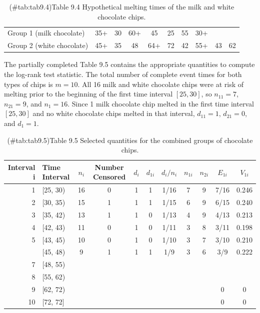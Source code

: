 \documentclass[
]{report}
\begin{document}
\begin{table}[!h]
\centering
\caption{(\#tab:tab9.4)Table 9.4 Hypothetical melting times of the milk and white chocolate chips.}
\centering
\begin{tabular}[t]{llcccccccc}
\toprule
  &  &  &  &  &  &  &  &  & \\
\midrule
Group 1 (milk chocolate) & 35+ & 30 & 60+ & 45 & 25 & 55 & 30+ &  & \\
Group 2 (white chocolate) & 45+ & 35 & 48 & 64+ & 72 & 42 & 55+ & 43 & 62\\
\bottomrule
\end{tabular}
\end{table}

The partially completed Table 9.5 contains the appropriate quantities to compute the log-rank test statistic. The total number of complete event times for both types of chips is \(m = 10\). All 16 milk and white chocolate chips were at risk of melting prior to the beginning of the first time interval \([25,30]\), so \(n_{11} = 7\), \(n_{21} = 9\), and \(n_1 = 16\). Since 1 milk chocolate chip melted in the first time interval \([25,30]\) and no white chocolate chips melted in that interval, \(d_{11} = 1\), \(d_{21} = 0\), and \(d_1 = 1\).

\begin{table}[!h]
\centering
\caption{(\#tab:tab9.5)Table 9.5 Selected quantities for the combined groups of chocolate chips.}
\centering
\begin{tabular}[t]{rlccccccccc}
\toprule
Interval i & Time Interval & $n_i$ & Number Censored & $d_i$ & $d_{1i}$ & $d_i/n_i$ & $n_{1i}$ & $n_{2i}$ & $E_{1i}$ & $V_{1i}$\\
\midrule
1 & {}[25, 30) & 16 & 0 & 1 & 1 & 1/16 & 7 & 9 & 7/16 & 0.246\\
2 & {}[30, 35) & 15 & 1 & 1 & 1 & 1/15 & 6 & 9 & 6/15 & 0.240\\
3 & {}[35, 42) & 13 & 1 & 1 & 0 & 1/13 & 4 & 9 & 4/13 & 0.213\\
4 & {}[42, 43) & 11 & 0 & 1 & 0 & 1/11 & 3 & 8 & 3/11 & 0.198\\
5 & {}[43, 45) & 10 & 0 & 1 & 0 & 1/10 & 3 & 7 & 3/10 & 0.210\\
\addlinespace
6 & {}[45, 48) & 9 & 1 & 1 & 1 & 1/9 & 3 & 6 & 3/9 & 0.222\\
7 & {}[48, 55) &  &  &  &  &  &  &  &  & \\
8 & {}[55, 62) &  &  &  &  &  &  &  &  & \\
9 & {}[62, 72) &  &  &  &  &  &  &  & 0 & 0\\
10 & {}[72, 72] &  &  &  &  &  &  &  & 0 & 0\\
\bottomrule
\end{tabular}
\end{table}
\end{document}
